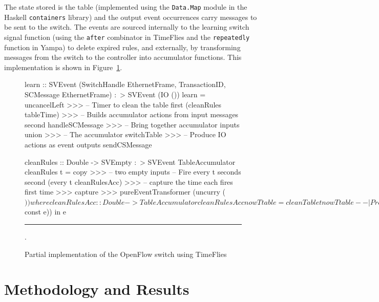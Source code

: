 The state stored is the table (implemented using the {\tt Data.Map} module in
the Haskell {\tt containers} library) and the output event occurrences carry
messages to be sent to the switch. The events are sourced internally to the
learning switch signal function (using the {\tt after} combinator in TimeFlies
and the {\tt repeatedly} function in Yampa) to delete expired rules, and
externally, by transforming messages from the switch to the controller into
accumulator functions. This implementation is shown in Figure~\ref{figure:openflow_implementation}.

\begin{figure}
\begin{code}
learn ::     SVEvent (SwitchHandle EthernetFrame,
                      TransactionID,
                      SCMessage EthernetFrame)
         :~> SVEvent (IO ())
learn = uncancelLeft >>>
        -- Timer to clean the table
        first (cleanRules tableTime) >>>
        -- Builds accumulator actions from input messages 
        second handleSCMessage >>>
        -- Bring together accumulator inputs     
        union >>> 
        -- The accumulator                       
        switchTable >>>
        -- Produce IO actions as event outputs                 
        sendCSMessage                    

cleanRules ::     Double
               -> SVEmpty
              :~> SVEvent TableAccumulator
cleanRules t = copy >>> -- two empty inputs
               -- Fire every t seconds
               second (every t cleanRulesAcc) >>> 
               -- capture the time each fires
               first time >>>
               capture >>>                        
               pureEventTransformer (uncurry ($))
  where 
    cleanRulesAcc :: Double -> TableAccumulator
    cleanRulesAcc nowT table = cleanTable t nowT table

-- | Produce an event with the given value at the given time interval
every :: Double -> a -> SVEmpty :~> SVEvent a
every t x = let e = switch (after t x >>>
                            copy >>>
                            second (pureEventTransformer $ const e))
            in e
\end{code}
\hrule
\caption{Partial implementation of the OpenFlow switch using TimeFlies}.
\label{figure:openflow_implementation}
\end{figure}

\section{Methodology and Results}
\label{section:Evaluation_and_Comparisons-Methodology_and_Results}

